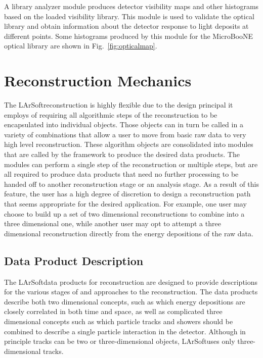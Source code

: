 \documentclass[12pt]{elsarticle}
\newcommand{\larsoft}{LArSoft}
\begin{document}
A library analyzer module produces detector visibility maps and other histograms based on the loaded visibility library.  This module is used to validate the optical library and obtain information about the detector response to light deposits at different points.  Some histograms produced by this module for the MicroBooNE optical library are shown in Fig.~\ref{fig:opticalmap}.


\section{Reconstruction Mechanics}

The \larsoft reconstruction is highly flexible due to the design principal it employs of requiring all algorithmic steps of the reconstruction to be encapsulated into individual objects.  Those objects can in turn be called in a variety of combinations that allow a user to move from basic raw data to very high level reconstruction.  These algorithm objects are consolidated into modules that are called by the framework to produce the desired data products.  The modules can perform a single step of the reconstruction or multiple steps, but are all required to produce data products that need no further processing to be handed off to another reconstruction stage or an analysis stage.  As a result of this feature, the user has a high degree of discretion to design a reconstruction path that seems appropriate for the desired application.  For example, one user may choose to build up a set of two dimensional reconstructions to combine into a three dimensional one, while another user may opt to attempt a three dimensional reconstruction directly from the energy depositions of the raw data.  

\subsection{Data Product Description}

The \larsoft data products for reconstruction are designed to provide descriptions for the various stages of and approaches to the reconstruction.  The data products describe both two dimensional concepts, such as which energy depositions are closely correlated in both time and space, as well as complicated three dimensional concepts such as which particle tracks and showers should be combined to describe a single particle interaction in the detector.
Although in principle tracks can be two or
three-dimensional objects, \larsoft uses only three-dimensional
tracks.
\end{document}
